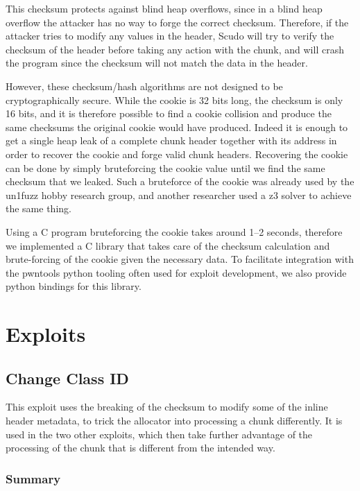 \documentclass[a4paper,11pt,oneside]{report}
\begin{document}
This checksum protects against blind heap overflows, since in a blind heap overflow the
attacker has no way to forge the correct checksum. Therefore, if the attacker tries to
modify any values in the header, Scudo will try to verify the checksum of the header
before taking any action with the chunk, and will crash the program since the checksum
will not match the data in the header.

However, these checksum/hash algorithms are not designed to be cryptographically
secure. While the cookie is 32 bits long, the checksum is only 16 bits, and it is
therefore possible to find a cookie collision and produce the same checksums the original
cookie would have produced. Indeed it is enough to get a single heap leak of a complete
chunk header together with its address in order to recover the cookie 
and forge valid chunk headers.
Recovering the cookie can be done by simply bruteforcing the
cookie value until we find the same checksum that we leaked. Such a bruteforce of the
cookie was already used by the un1fuzz hobby research group, and another researcher used a
z3 solver to achieve the same thing.~\cite{un1fuzz}~\cite{z3SolveScudoCookie}

Using a C program bruteforcing the cookie takes around 1–2 seconds, therefore we
implemented a C library that takes care of the checksum calculation and brute-forcing of
the cookie given the necessary data. To facilitate integration with the pwntools python
tooling often used for exploit development, we also provide python bindings for this
library.

\chapter{Exploits}

\section{Change Class ID}

This exploit uses the breaking of the checksum to modify some of the inline header
metadata, to trick the allocator into processing a chunk differently. It is used in the
two other exploits, which then take further advantage of the processing of the chunk that
is different from the intended way.

\subsection{Summary}
\end{document}
